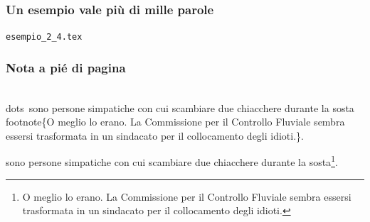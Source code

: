 \documentclass[svgnames,%
	ucs,%
	pdftex]{guitbeamer}
\begin{document}
\begin{frame}
  \frametitle{Un esempio vale pi\`u di mille parole}
	\begin{center}
		\alert{\texttt{esempio\_2\_4.tex}}
	\end{center}
\end{frame}
\begin{frame}
   \frametitle{Nota a pi\'e di pagina}
	\begin{LaTeXcode}
		\ls\\dots\rs\ sono persone simpatiche con cui scambiare due
		chiacchere durante la sosta\alert{\\footnote\{}O meglio lo
		erano. La Commissione per il Controllo Fluviale sembra essersi
		trasformata in un sindacato per il collocamento degli
		idioti.\alert{\}}.
	\end{LaTeXcode}
	\begin{LaTeXoutput}[]
		 [\dots] sono persone simpatiche con cui scambiare due chiacchere
		 durante la sosta\footnote{\textrm{O meglio lo erano. La
		 Commissione per il Controllo Fluviale sembra essersi trasformata
		 in un sindacato per il collocamento degli idioti.}}.
	\end{LaTeXoutput}
\end{frame}
\end{document}

